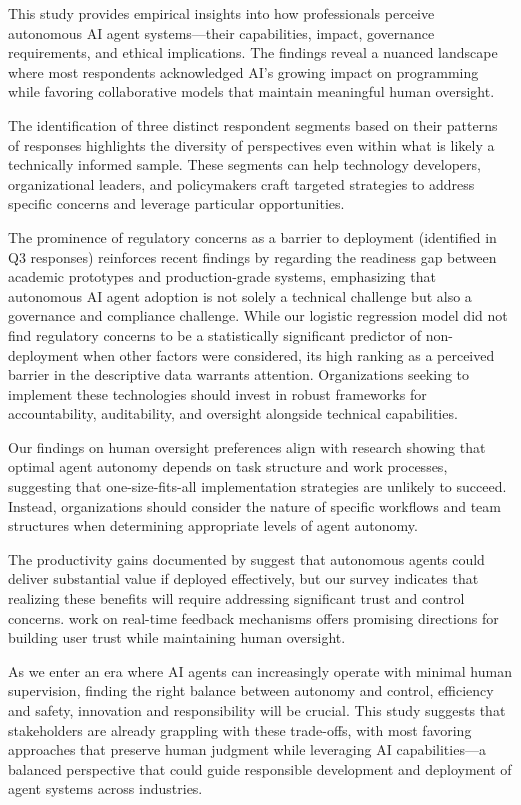 \documentclass{article}
\begin{document}
This study provides empirical insights into how professionals perceive
autonomous AI agent systems---their capabilities, impact, governance
requirements, and ethical implications. The findings reveal a nuanced
landscape where most respondents acknowledged AI's growing impact on
programming while favoring collaborative models that maintain meaningful
human oversight.

The identification of three distinct respondent segments based on their patterns of responses highlights the
diversity of perspectives even within what is likely a technically
informed sample. These segments can help technology developers,
organizational leaders, and policymakers craft targeted strategies to
address specific concerns and leverage particular opportunities.

The prominence of regulatory concerns as a barrier to deployment (identified in Q3 responses)
reinforces recent findings by \cite{Wrona2023} regarding the
readiness gap between academic prototypes and production-grade systems,
emphasizing that autonomous AI agent adoption is not solely a technical
challenge but also a governance and compliance challenge. While our logistic regression model did not find regulatory concerns to be a statistically significant predictor of non-deployment when other factors were considered, its high ranking as a perceived barrier in the descriptive data warrants attention. Organizations
seeking to implement these technologies should invest in robust
frameworks for accountability, auditability, and oversight alongside
technical capabilities.

Our findings on human oversight preferences align with \cite{Hauptman2022} research showing that optimal agent autonomy depends on task
structure and work processes, suggesting that one-size-fits-all
implementation strategies are unlikely to succeed. Instead,
organizations should consider the nature of specific workflows and team
structures when determining appropriate levels of agent autonomy.

The productivity gains documented by \cite{NoyZhang2023} suggest that
autonomous agents could deliver substantial value if deployed
effectively, but our survey indicates that realizing these benefits will
require addressing significant trust and control concerns. \cite{Brown2025} work on real-time feedback mechanisms offers promising
directions for building user trust while maintaining human oversight.

As we enter an era where AI agents can increasingly operate with minimal
human supervision, finding the right balance between autonomy and
control, efficiency and safety, innovation and responsibility will be
crucial. This study suggests that stakeholders are already grappling
with these trade-offs, with most favoring approaches that preserve human
judgment while leveraging AI capabilities---a balanced perspective that
could guide responsible development and deployment of agent systems
across industries.
\end{document}

